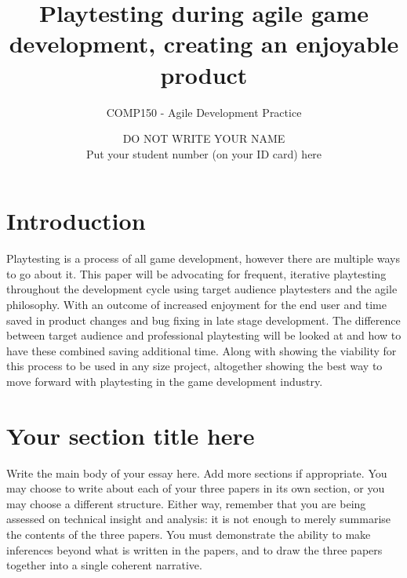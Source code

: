\documentclass{scrartcl}
\title{Playtesting during agile game development, creating an enjoyable product}
\subtitle{COMP150 - Agile Development Practice}
\author{DO NOT WRITE YOUR NAME\\Put your student number (on your ID card) here}
\begin{document}
\maketitle


\section{Introduction}

Playtesting is a process of all game development, however there are multiple ways to go about it. This paper will be advocating for frequent, iterative playtesting throughout the development cycle using target audience playtesters and the agile philosophy. With an outcome of increased enjoyment for the end user and time saved in product changes and bug fixing in late stage development. The difference between target audience and professional playtesting will be looked at and how to have these combined saving additional time. Along with showing the viability for this process to be used in any size project, altogether showing the best way to move forward with playtesting in the game development industry.

\section{Your section title here}

Write the main body of your essay here. Add more sections if appropriate. You may choose to write about each of your three papers in its own section, or you may choose a different structure. Either way, remember that you are being assessed on technical insight and analysis: it is not enough to merely summarise the contents of the three papers. You must demonstrate the ability to make inferences beyond what is written in the papers, and to draw the three papers together into a single coherent narrative.
\end{document}
